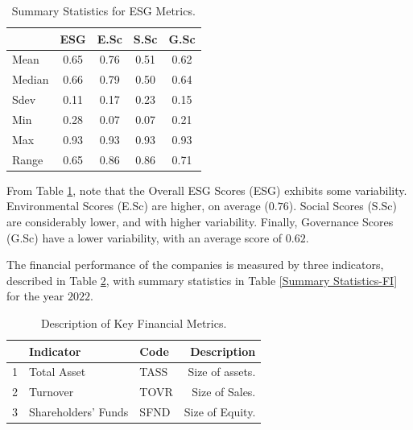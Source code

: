 \documentclass{article}
\begin{document}
\begin{table}[!ht]
    \centering
    \footnotesize
    \begin{tabular}{lcccc}
        \toprule
        & ESG & E.Sc & S.Sc & G.Sc \\
        \midrule
        Mean   & 0.65 & 0.76 & 0.51 & 0.62 \\
        Median & 0.66 & 0.79 & 0.50 & 0.64 \\
        Sdev   & 0.11 & 0.17 & 0.23 & 0.15 \\
        Min    & 0.28 & 0.07 & 0.07 & 0.21 \\
        Max    & 0.93 & 0.93 & 0.93 & 0.93 \\
        Range  & 0.65 & 0.86 & 0.86 & 0.71 \\
        \bottomrule
    \end{tabular}
    \caption{Summary Statistics for ESG Metrics.}
    \label{Summary Statistics-ESG}
\end{table}

From Table \ref{Summary Statistics-ESG}, note that the Overall ESG Scores (ESG) exhibits some variability.
Environmental Scores (E.Sc) are  higher, on average ($0.76$).  Social Scores (S.Sc) are considerably lower, and  with higher variability. Finally, 
Governance Scores (G.Sc) have a lower  variability, with an average score of $0.62$.
% 

	
% 
The financial performance of the companies is measured by three indicators, described in 
Table \ref{Variable-Definitions}, with summary statistics in Table \ref{Summary Statistics-FI} for the year $2022$.

\begin{table}[!ht]
    \centering
    \footnotesize
    \begin{tabular}{cllr}
        \toprule
        & Indicator & Code & Description \\ 
        \midrule
        1 & Total Asset & TASS & Size of assets. \\ 
    
        2 & Turnover & TOVR &  Size of Sales. \\ 
        
        3 & Shareholders' Funds & SFND & Size of Equity. \\ 
    
        \bottomrule
    \end{tabular}
    \caption{Description of Key Financial Metrics.}
    \label{Variable-Definitions}
\end{table}
\end{document}
